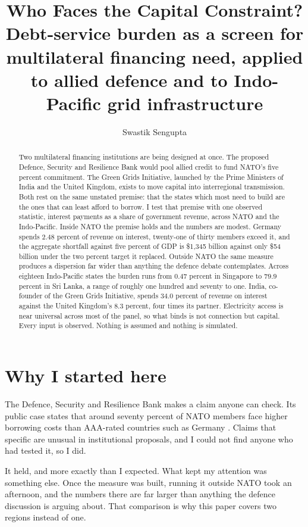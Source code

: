 \documentclass[10pt,twocolumn]{article}
\title{\vspace{-1.6em}\Large Who Faces the Capital Constraint?\\
\normalsize\vspace{0.4em}Debt-service burden as a screen for multilateral financing need,
applied to allied defence and to Indo-Pacific grid infrastructure\vspace{-0.4em}}
\author{\normalsize Swastik Sengupta\vspace{-1em}}
\date{}
\begin{document}
\maketitle
\vspace{-3em}

\begin{abstract}
\noindent
Two multilateral financing institutions are being designed at once. The proposed
Defence, Security and Resilience Bank would pool allied credit to fund NATO's
five percent commitment. The Green Grids Initiative, launched by the Prime
Ministers of India and the United Kingdom, exists to move capital into
interregional transmission. Both rest on the same unstated premise: that the
states which most need to build are the ones that can least afford to borrow. I
test that premise with one observed statistic, interest payments as a share of
government revenue, across NATO and the Indo-Pacific. Inside NATO the premise
holds and the numbers are modest. Germany spends $2.48$ percent of revenue on
interest, twenty-one of thirty members exceed it, and the aggregate shortfall
against five percent of GDP is \$1{,}345 billion against only \$54 billion under
the two percent target it replaced. Outside NATO the same measure produces a
dispersion far wider than anything the defence debate contemplates. Across
eighteen Indo-Pacific states the burden runs from $0.47$ percent in Singapore to
$79.9$ percent in Sri Lanka, a range of roughly one hundred and seventy to one.
India, co-founder of the Green Grids Initiative, spends $34.0$ percent of revenue
on interest against the United Kingdom's $8.3$ percent, four times its partner.
Electricity access is near universal across most of the panel, so what binds is
not connection but capital. Every input is observed. Nothing is assumed and
nothing is simulated.
\end{abstract}

\section{Why I started here}

The Defence, Security and Resilience Bank makes a claim anyone can check. Its
public case states that around seventy percent of NATO members face higher
borrowing costs than AAA-rated countries such as Germany \cite{dsrb}. Claims that
specific are unusual in institutional proposals, and I could not find anyone who
had tested it, so I did.

It held, and more exactly than I expected. What kept my attention was something
else. Once the measure was built, running it outside NATO took an afternoon, and
the numbers there are far larger than anything the defence discussion is arguing
about. That comparison is why this paper covers two regions instead of one.
\end{document}
